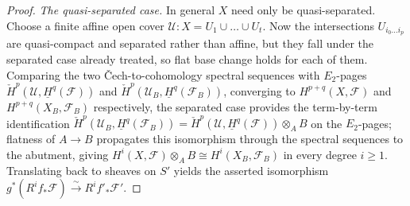 \begin{proof}
  \medskip
  \emph{The quasi-separated case.} In general \(X\) need only be quasi-separated.
  Choose a finite affine open cover \(\mathcal{U} : X = U_1 \cup \dots \cup U_t\).
  Now the intersections \(U_{i_0 \dots i_p}\) are quasi-compact and separated rather
  than affine, but they fall under the separated case already treated, so flat base
  change holds for each of them. Comparing the two {\v C}ech-to-cohomology spectral
  sequences with \(E_2\)-pages
  \(\check{H}^p(\mathcal{U}, \underline{H}^q(\mathcal{F}))\) and
  \(\check{H}^p(\mathcal{U}_B, \underline{H}^q(\mathcal{F}_B))\), converging to
  \(H^{p+q}(X, \mathcal{F})\) and \(H^{p+q}(X_B, \mathcal{F}_B)\) respectively, the
  separated case provides the term-by-term identification
  \(\check{H}^p(\mathcal{U}_B, \underline{H}^q(\mathcal{F}_B)) =
  \check{H}^p(\mathcal{U}, \underline{H}^q(\mathcal{F})) \otimes_A B\) on the
  \(E_2\)-pages; flatness of \(A \to B\) propagates this isomorphism through the
  spectral sequences to the abutment, giving
  \(H^i(X, \mathcal{F}) \otimes_A B \cong H^i(X_B, \mathcal{F}_B)\) in every degree
  \(i \geq 1\). Translating back to sheaves on \(S'\) yields the asserted
  isomorphism \(g^*(R^i f_*\mathcal{F}) \xrightarrow{\sim} R^i f'_*\mathcal{F}'\).
\end{proof}
